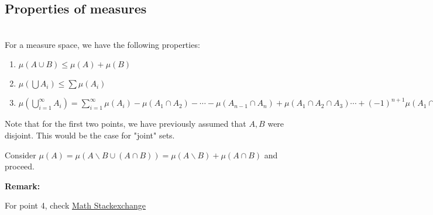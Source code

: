 \subsection{Properties of measures}\hfill\\
\noindent For a measure space, we have the following properties:\par
\begin{enumerate}[leftmargin=*]
  \item $\mu(A\cup B)\leq \mu(A)+\mu(B)$
  \item $\mu\left(\bigcup A_i\right)\leq \sum\mu(A_i)$
  \item $\mu\left(\bigcup_{i=1}^{\infty}A_i\right) = \sum_{i=1}^{\infty}\mu(A_i)-\mu(A_1\cap A_2)-\cdots-\mu(A_{n-1}\cap A_n) + \mu(A_1\cap A_2\cap A_3)\cdots + (-1)^{n+1}\mu(A_1\cap A_2\cdots\cap A_n)$
\end{enumerate}
\par\bigskip
\noindent Note that for the first two points, we have previously assumed that $A,B$ were disjoint. This would be the case for "joint" sets.
\par\bigskip
\begin{prf}[]{}
  Consider $\mu(A) = \mu(A\backslash B\cup (A\cap B)) = \mu(A\backslash B) + \mu(A\cap B)$ and proceed.
\end{prf}
\par\bigskip
\noindent\textbf{Remark:}\par
\noindent For point 4, check \href{https://math.stackexchange.com/questions/1487456/a-closed-formula-for-the-measure-of-the-union-of-n-sets}{Math Stackexchange}
